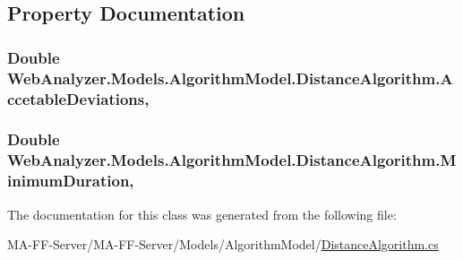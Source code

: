 \subsection{Property Documentation}
\hypertarget{class_web_analyzer_1_1_models_1_1_algorithm_model_1_1_distance_algorithm_abb27c8690d9554003d172ae39f454110}{}
\subsubsection[{Accetable\+Deviations}]{\setlength{\rightskip}{0pt plus 5cm}Double Web\+Analyzer.\+Models.\+Algorithm\+Model.\+Distance\+Algorithm.\+Accetable\+Deviations\hspace{0.3cm}{\ttfamily [get]}, {\ttfamily [set]}}\label{class_web_analyzer_1_1_models_1_1_algorithm_model_1_1_distance_algorithm_abb27c8690d9554003d172ae39f454110}
\hypertarget{class_web_analyzer_1_1_models_1_1_algorithm_model_1_1_distance_algorithm_a6dbf956e238fe79191f05d4461ca3a20}{}
\subsubsection[{Minimum\+Duration}]{\setlength{\rightskip}{0pt plus 5cm}Double Web\+Analyzer.\+Models.\+Algorithm\+Model.\+Distance\+Algorithm.\+Minimum\+Duration\hspace{0.3cm}{\ttfamily [get]}, {\ttfamily [set]}}\label{class_web_analyzer_1_1_models_1_1_algorithm_model_1_1_distance_algorithm_a6dbf956e238fe79191f05d4461ca3a20}


The documentation for this class was generated from the following file\+:\begin{DoxyCompactItemize}
\item 
M\+A-\/\+F\+F-\/\+Server/\+M\+A-\/\+F\+F-\/\+Server/\+Models/\+Algorithm\+Model/\hyperlink{_distance_algorithm_8cs}{Distance\+Algorithm.\+cs}\end{DoxyCompactItemize}
